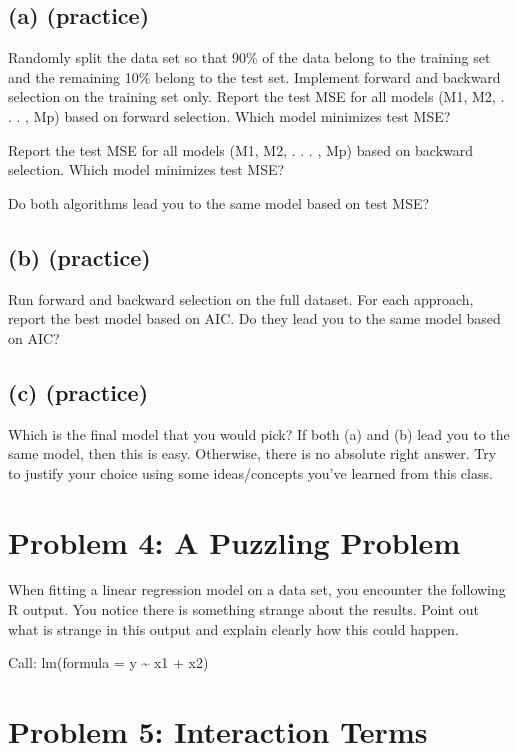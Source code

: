 \documentclass[
]{article}
\begin{document}
\subsection{(a) (practice)}\label{a-practice}

Randomly split the data set so that 90\% of the data belong to the
training set and the remaining 10\% belong to the test set. Implement
forward and backward selection on the training set only. Report the test
MSE for all models (M1, M2, . . . , Mp) based on forward selection.
Which model minimizes test MSE?

Report the test MSE for all models (M1, M2, . . . , Mp) based on
backward selection. Which model minimizes test MSE?

Do both algorithms lead you to the same model based on test MSE?

\subsection{(b) (practice)}\label{b-practice}

Run forward and backward selection on the full dataset. For each
approach, report the best model based on AIC. Do they lead you to the
same model based on AIC?

\subsection{(c) (practice)}\label{c-practice-1}

Which is the final model that you would pick? If both (a) and (b) lead
you to the same model, then this is easy. Otherwise, there is no
absolute right answer. Try to justify your choice using some
ideas/concepts you've learned from this class.

\section{Problem 4: A Puzzling
Problem}\label{problem-4-a-puzzling-problem}

When fitting a linear regression model on a data set, you encounter the
following R output. You notice there is something strange about the
results. Point out what is strange in this output and explain clearly
how this could happen.

Call: lm(formula = y \textasciitilde{} x1 + x2)

\section{Problem 5: Interaction
Terms}\label{problem-5-interaction-terms}
\end{document}
